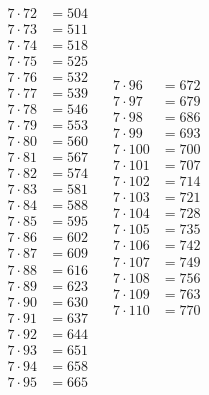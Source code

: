 \documentclass[12pt]{article}
\theoremstyle{definition}
\numberwithin{equation}{qn}
\begin{document}
\begin{enumerate}
$$\begin{matrix}
            7 \cdot 72 &= 504 \\ 7 \cdot 73 &= 511 \\ 7 \cdot 74 &= 518 \\
            7 \cdot 75 &= 525 \\ 7 \cdot 76 &= 532 \\ 7 \cdot 77 &= 539 \\
            7 \cdot 78 &= 546 \\ 7 \cdot 79 &= 553 \\ 7 \cdot 80 &= 560 \\
            7 \cdot 81 &= 567 \\ 7 \cdot 82 &= 574 \\ 7 \cdot 83 &= 581 \\
            7 \cdot 84 &= 588 \\ 7 \cdot 85 &= 595 \\ 7 \cdot 86 &= 602 \\
            7 \cdot 87 &= 609 \\ 7 \cdot 88 &= 616 \\ 7 \cdot 89 &= 623 \\
            7 \cdot 90 &= 630 \\ 7 \cdot 91 &= 637 \\ 7 \cdot 92 &= 644 \\
            7 \cdot 93 &= 651 \\ 7 \cdot 94 &= 658 \\ 7 \cdot 95 &= 665 \\
        \end{matrix} \quad \begin{matrix}
            7 \cdot 96 &= 672 \\ 7 \cdot 97 &= 679 \\ 7 \cdot 98 &= 686 \\
            7 \cdot 99 &= 693 \\ 7 \cdot 100 &= 700 \\ 7 \cdot 101 &= 707 \\
            7 \cdot 102 &= 714 \\ 7 \cdot 103 &= 721 \\ 7 \cdot 104 &= 728 \\
            7 \cdot 105 &= 735 \\ 7 \cdot 106 &= 742 \\ 7 \cdot 107 &= 749 \\
            7 \cdot 108 &= 756 \\ 7 \cdot 109 &= 763 \\ 7 \cdot 110 &= 770 \\

\end{matrix}$$
\end{enumerate}
\end{document}
